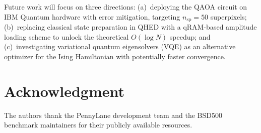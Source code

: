\documentclass[journal]{IEEEtran}
\begin{document}
Future work will focus on three directions: (a)~deploying the QAOA circuit
on IBM Quantum hardware with error mitigation, targeting $n_{\text{sp}} = 50$
superpixels; (b)~replacing classical state preparation in QHED with a
qRAM-based amplitude loading scheme to unlock the theoretical $O(\log N)$
speedup; and (c)~investigating variational quantum eigensolvers (VQE) as an
alternative optimizer for the Ising Hamiltonian with potentially faster
convergence.

\section*{Acknowledgment}
The authors thank the PennyLane development team and the BSD500 benchmark
maintainers for their publicly available resources.



\end{document}

